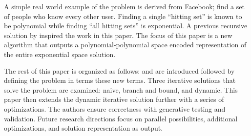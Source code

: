 A simple real world example of the problem is derived from Facebook; find a set of people who know every other user. Finding a single ``hitting set'' is known to be polynomial while finding ``all hitting sets'' is exponential. A previous recursive solution by  \cite{kavvadias2005efficient} inspired the work in this paper. The focus of this paper is a new algorithm that outputs a polynomial-polynomial space encoded representation of the entire exponential space solution.

The rest of this paper is organized as follows:   and  are introduced followed by defining the problem in terms these new terms. Three iterative solutions that solve the problem are examined: naive, branch and bound, and dynamic. This paper then extends the dynamic iterative solution further with a series of optimizations. The authors ensure correctness with generative testing and validation. Future research directions focus on parallel possibilities, additional optimizations, and solution representation as output.


 
